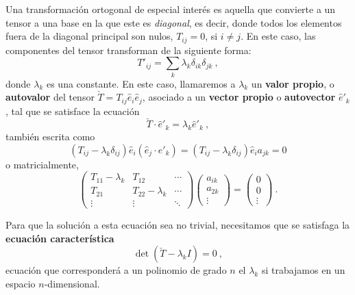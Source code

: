 Una transformación ortogonal de especial interés es aquella que convierte a un tensor a una base en la que este es \emph{diagonal}, es decir, donde todos los elementos fuera de la diagonal principal son nulos, $T_{ij} = 0$, si $i \neq j$. En este caso, las componentes del tensor transforman de la siguiente forma:
\begin{equation}
    T'_{ij} = \sum_k \lambda_k \delta_{ik} \delta_{jk} \ ,
\end{equation}
donde $\lambda_k$ es una constante. En este caso, llamaremos a $\lambda_k$ un \textbf{valor propio}, o \textbf{autovalor} del tensor $\check{T} = T_{ij} \hat{e}_i \hat{e}_j$, asociado a un \textbf{vector propio} o \textbf{autovector} $\hat{e}'_k$, tal que se satisface la ecuación
\begin{equation}
    \check{T} \cdot \hat{e}'_k = \lambda_k \hat{e}'_k \ ,
\end{equation}
también escrita como 
\begin{equation}
    (T_{ij} - \lambda_k \delta_{ij}) \hat{e}_i (\hat{e}_j \cdot \hat{e}'_k) = (T_{ij} - \lambda_k \delta_{ij}) \hat{e}_i a_{jk} = 0
\end{equation}
o matricialmente,
\begin{equation} \label{eq:descomposicion}
    \begin{pmatrix}
        T_{11} - \lambda_k & T_{12} & \cdots \\
        T_{21} & T_{22} - \lambda_k & \cdots \\
        \vdots & \vdots & \ddots
    \end{pmatrix} 
    \begin{pmatrix}
        a_{ik} \\ a_{2k} \\ \vdots
    \end{pmatrix}
     = 
    \begin{pmatrix}
        0 \\ 0 \\ \vdots
    \end{pmatrix} \ .
\end{equation}

Para que la solución a esta ecuación sea no trivial, necesitamos que se satisfaga la \textbf{ecuación característica}
\begin{equation}
    \det(\check{T} - \lambda_k I) = 0 \ ,
\end{equation}
ecuación que corresponderá a un polinomio de grado $n$ el $\lambda_k$ si trabajamos en un espacio $n$-dimensional.

